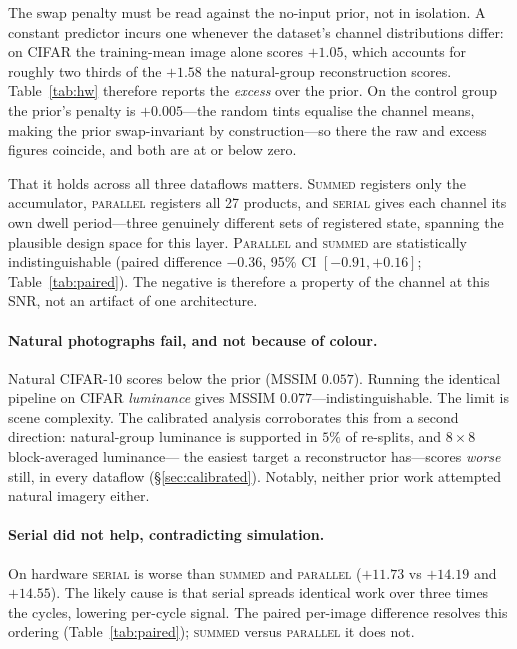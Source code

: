 \documentclass[10pt,conference]{article}
\begin{document}
The swap penalty must be read against the no-input prior, not in isolation. A constant
predictor incurs one whenever the dataset's channel distributions differ: on CIFAR the
training-mean image alone scores $+1.05$, which accounts for roughly two thirds of the
$+1.58$ the natural-group reconstruction scores. Table~\ref{tab:hw} therefore reports the
\emph{excess} over the prior. On the control group the prior's penalty is $+0.005$---the
random tints equalise the channel means, making the prior swap-invariant by
construction---so there the raw and excess figures coincide, and both are at or below
zero.

That it holds across all three dataflows matters. \textsc{Summed} registers only the
accumulator, \textsc{parallel} registers all 27 products, and \textsc{serial} gives each
channel its own dwell period---three genuinely different sets of registered state,
spanning the plausible design space for this layer. \textsc{Parallel} and \textsc{summed}
are statistically indistinguishable (paired difference $-0.36$, 95\% CI
$[-0.91, +0.16]$; Table~\ref{tab:paired}). The negative is therefore a
property of the channel at this SNR, not an artifact of one architecture.

\paragraph{Natural photographs fail, and not because of colour.} Natural CIFAR-10 scores
below the prior (MSSIM $0.057$). Running the identical pipeline on CIFAR
\emph{luminance} gives MSSIM $0.077$---indistinguishable. The limit is scene complexity.
The calibrated analysis corroborates this from a second direction: natural-group
luminance is supported in $5\%$ of re-splits, and $8\times8$ block-averaged luminance---
the easiest target a reconstructor has---scores \emph{worse} still, in every dataflow
(\S\ref{sec:calibrated}). Notably, neither prior work attempted natural imagery either.

\paragraph{Serial did not help, contradicting simulation.} On hardware \textsc{serial} is
worse than \textsc{summed} and \textsc{parallel} ($+11.73$ vs $+14.19$ and $+14.55$). The
likely cause is that serial spreads identical work over three times the cycles, lowering
per-cycle signal. The paired per-image difference resolves this ordering
(Table~\ref{tab:paired}); \textsc{summed} versus \textsc{parallel} it does not.
\end{document}
